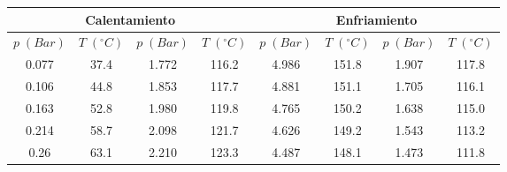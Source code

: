 \documentclass[a4paper,12pt,titlepage]{article}
\begin{document}
\newpage

\begin{table}[]
\centering
\begin{tabular}{|cccccccc}
\hline
\multicolumn{4}{|c|}{Calentamiento}                                                                                                                      & \multicolumn{4}{c|}{Enfriamiento}                                                                                                                       \\ \hline
\multicolumn{1}{|c|}{$p \;(Bar)$} & \multicolumn{1}{c|}{$T \; (^{\circ}C)$} & \multicolumn{1}{c|}{$p \;(Bar)$} & \multicolumn{1}{c|}{$T \; (^{\circ}C)$} & \multicolumn{1}{c|}{$p \;(Bar)$} & \multicolumn{1}{c|}{$T \; (^{\circ}C)$} & \multicolumn{1}{c|}{$p \;(Bar)$} & \multicolumn{1}{c|}{$T \; (^{\circ}C)$} \\ \hline
\multicolumn{1}{|c|}{0.077}       & \multicolumn{1}{c|}{37.4}               & \multicolumn{1}{c|}{1.772}       & \multicolumn{1}{c|}{116.2}              & \multicolumn{1}{c|}{4.986}       & \multicolumn{1}{c|}{151.8}              & \multicolumn{1}{c|}{1.907}       & \multicolumn{1}{c|}{117.8}              \\ \hline
\multicolumn{1}{|c|}{0.106}       & \multicolumn{1}{c|}{44.8}               & \multicolumn{1}{c|}{1.853}       & \multicolumn{1}{c|}{117.7}              & \multicolumn{1}{c|}{4.881}       & \multicolumn{1}{c|}{151.1}              & \multicolumn{1}{c|}{1.705}       & \multicolumn{1}{c|}{116.1}              \\ \hline
\multicolumn{1}{|c|}{0.163}       & \multicolumn{1}{c|}{52.8}               & \multicolumn{1}{c|}{1.980}       & \multicolumn{1}{c|}{119.8}              & \multicolumn{1}{c|}{4.765}       & \multicolumn{1}{c|}{150.2}              & \multicolumn{1}{c|}{1.638}       & \multicolumn{1}{c|}{115.0}              \\ \hline
\multicolumn{1}{|c|}{0.214}       & \multicolumn{1}{c|}{58.7}               & \multicolumn{1}{c|}{2.098}       & \multicolumn{1}{c|}{121.7}              & \multicolumn{1}{c|}{4.626}       & \multicolumn{1}{c|}{149.2}              & \multicolumn{1}{c|}{1.543}       & \multicolumn{1}{c|}{113.2}              \\ \hline
\multicolumn{1}{|c|}{0.26}        & \multicolumn{1}{c|}{63.1}               & \multicolumn{1}{c|}{2.210}       & \multicolumn{1}{c|}{123.3}              & \multicolumn{1}{c|}{4.487}       & \multicolumn{1}{c|}{148.1}              & \multicolumn{1}{c|}{1.473}       & \multicolumn{1}{c|}{111.8}              \\ \hline

\end{tabular}
\end{table}
\end{document}
